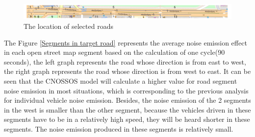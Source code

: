 \documentclass{article}
\begin{document}
\begin{figure}[h]
    \begin{center}
        \includegraphics[width=\textwidth]{road11.png}
        \caption{The location of selected roads}
        \label{road11}
    \end{center}
\end{figure}

\noindent The Figure \ref{Segments in target road} represents the average noise emission effect in each open street map segment based on the calculation of one cycle(90 seconds), the left graph represents the road whose direction is from east to west, the right graph represents the road whose direction is from west to east. It can be seen that the CNOSSOS model will calculate a higher value for road segment noise emission in most situations, which is corresponding to the previous analysis for individual vehicle noise emission. Besides, the noise emission of the 2 segments in the west is smaller than the other segment, because the vehicles driven in these segments have to be in a relatively high speed, they will be heard shorter in these segments. The noise emission produced in these segments is relatively small.
\end{document}
